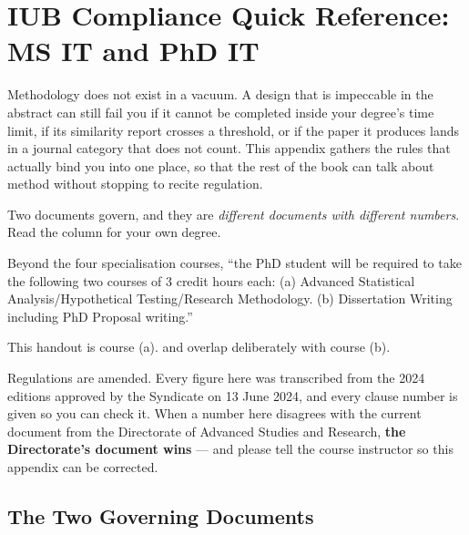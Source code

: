 \chapter{IUB Compliance Quick Reference: MS IT and PhD IT}\label{app:compliance}

Methodology does not exist in a vacuum. A design that is impeccable in the
abstract can still fail you if it cannot be completed inside your degree's
time limit, if its similarity report crosses a threshold, or if the paper it
produces lands in a journal category that does not count. This appendix
gathers the rules that actually bind you into one place, so that the rest of
the book can talk about method without stopping to recite regulation.

Two documents govern, and they are \emph{different documents with different
numbers}. Read the column for your own degree.

\begin{regbox}
Beyond the four specialisation courses, ``the PhD student will be required to
take the following two courses of 3 credit hours each: (a) Advanced Statistical
Analysis/Hypothetical Testing/Research Methodology. (b) Dissertation Writing
including PhD Proposal writing.''

\medskip
This handout is course (a).  and  overlap
deliberately with course (b).
\end{regbox}

\begin{alertbox}
Regulations are amended. Every figure here was transcribed from the 2024
editions approved by the Syndicate on 13 June 2024, and every clause number is
given so you can check it. When a number here disagrees with the current
document from the Directorate of Advanced Studies and Research, \textbf{the
Directorate's document wins} --- and please tell the course instructor so this
appendix can be corrected.
\end{alertbox}

\section{The Two Governing Documents}

